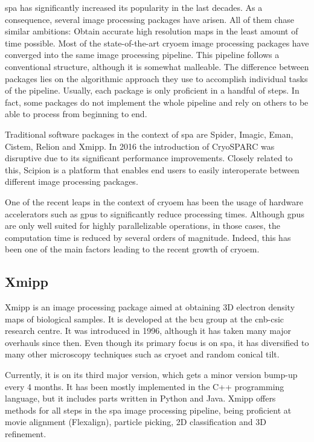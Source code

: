\documentclass[../main.tex]{subfiles}
\begin{document}
\Gls{spa} has significantly increased its popularity in the last decades. As a consequence, several image processing packages have arisen. All of them chase similar ambitions: Obtain accurate high resolution maps in the least amount of time possible. Most of the state-of-the-art \gls{cryoem} image processing packages have converged into the same image processing pipeline. This pipeline follows a conventional structure, although it is somewhat malleable. The difference between packages lies on the algorithmic approach they use to accomplish individual tasks of the pipeline. Usually, each package is only proficient in a handful of steps. In fact, some packages do not implement the whole pipeline and rely on others to be able to process from beginning to end.

Traditional software packages in the context of \gls{spa} are Spider\cite{shaikh2008}, Imagic, Eman\cite{ludke2000}, Cistem\cite{grigorieff2018}, Relion\cite{scheres2021} and Xmipp\cite{sorzano2004}. In 2016 the introduction of CryoSPARC\cite{cryosparc} was disruptive due to its significant performance improvements. Closely related to this, Scipion\cite{delarosa2016} is a platform that enables end users to easily interoperate between different image processing packages.

One of the recent leaps in the context of \gls{cryoem} has been the usage of hardware accelerators such as \glspl{gpu} to significantly reduce processing times. Although \glspl{gpu} are only well suited for highly parallelizable operations, in those cases, the computation time is reduced by several orders of magnitude. Indeed, this has been one of the main factors leading to the recent growth of \gls{cryoem}.

\subsection{Xmipp}
Xmipp is an image processing package aimed at obtaining 3D electron density maps of biological samples. It is developed at the \gls{bcu} group at the \gls{cnb}-\gls{csic} research centre. It was introduced in 1996, although it has taken many major overhauls since then. Even though its primary focus is on \gls{spa}, it has diversified to many other microscopy techniques such as \gls{cryoet} and random conical tilt\cite{sorzano2004}.

Currently, it is on its third major version, which gets a minor version bump-up every 4 months. It has been mostly implemented in the C++ programming language, but it includes parts written in Python and Java. Xmipp offers methods for all steps in the \gls{spa} image processing pipeline, being proficient at movie alignment (Flexalign)\cite{strelak2021a}, particle picking, 2D classification and 3D refinement.
\end{document}

